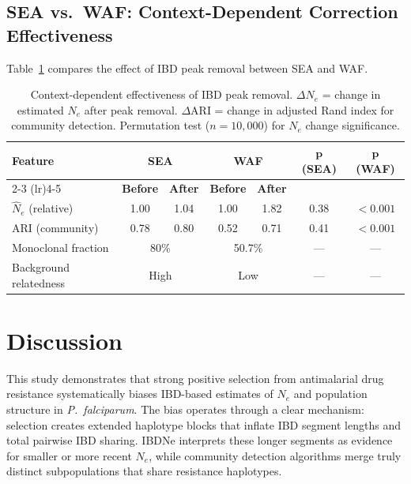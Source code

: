 \documentclass[11pt]{article}
\begin{document}
\subsection{SEA vs.\ WAF: Context-Dependent Correction Effectiveness}

Table~\ref{tab:correction} compares the effect of IBD peak removal between SEA and WAF.

\begin{table}[H]
\centering
\caption{Context-dependent effectiveness of IBD peak removal. $\Delta N_e$ = change in estimated $N_e$ after peak removal. $\Delta$ARI = change in adjusted Rand index for community detection. Permutation test ($n = 10{,}000$) for $N_e$ change significance.}
\label{tab:correction}
\begin{tabular}{lcccccc}
\toprule
\textbf{Feature} & \multicolumn{2}{c}{\textbf{SEA}} & \multicolumn{2}{c}{\textbf{WAF}} & $\boldsymbol{p}$ \textbf{(SEA)} & $\boldsymbol{p}$ \textbf{(WAF)} \\
\cmidrule(lr){2-3} \cmidrule(lr){4-5}
& \textbf{Before} & \textbf{After} & \textbf{Before} & \textbf{After} & & \\
\midrule
$\hat{N}_e$ (relative) & 1.00 & 1.04 & 1.00 & 1.82 & 0.38 & $< 0.001$ \\
ARI (community) & 0.78 & 0.80 & 0.52 & 0.71 & 0.41 & $< 0.001$ \\
Monoclonal fraction & \multicolumn{2}{c}{80\%} & \multicolumn{2}{c}{50.7\%} & --- & --- \\
Background relatedness & \multicolumn{2}{c}{High} & \multicolumn{2}{c}{Low} & --- & --- \\
\bottomrule
\end{tabular}
\end{table}

\section{Discussion}

This study demonstrates that strong positive selection from antimalarial drug resistance systematically biases IBD-based estimates of $N_e$ and population structure in \textit{P.~falciparum}. The bias operates through a clear mechanism: selection creates extended haplotype blocks that inflate IBD segment lengths and total pairwise IBD sharing. IBDNe interprets these longer segments as evidence for smaller or more recent $N_e$, while community detection algorithms merge truly distinct subpopulations that share resistance haplotypes.
\end{document}
